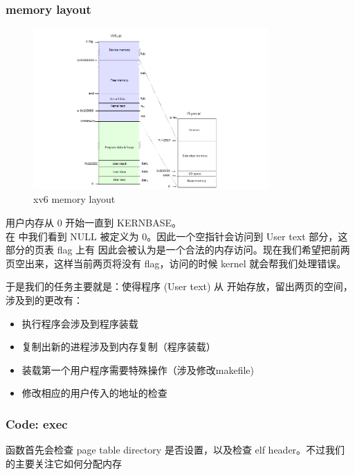 \subsubsection{memory layout}

\begin{figure}[h]
    \centering
    \includegraphics[width=0.8\textwidth]{img/memlayout.PNG}
    \caption{xv6 memory layout}
    \label{fig:2}
\end{figure}

用户内存从 0 开始一直到 KERNBASE。
\\ 在  中我们看到 NULL 被定义为 0。因此一个空指针会访问到 User text 部分，这部分的页表 flag 上有  因此会被认为是一个合法的内存访问。现在我们希望把前两页空出来，这样当前两页将没有  flag，访问的时候 kernel 就会帮我们处理错误。

于是我们的任务主要就是：使得程序 (User text) 从  开始存放，留出两页的空间，涉及到的更改有：

\begin{itemize}
    \item {} 执行程序会涉及到程序装载
    \item {} 复制出新的进程涉及到内存复制（程序装载）
    \item {} 装载第一个用户程序需要特殊操作（涉及修改makefile)
    \item 修改相应的用户传入的地址的检查
\end{itemize}


\subsubsection{Code: exec}

 函数首先会检查 page table directory 是否设置，以及检查 elf header。不过我们的主要关注它如何分配内存

